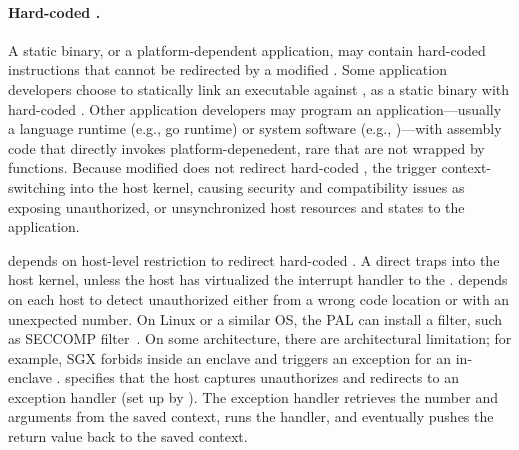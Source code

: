 \paragraph{Hard-coded \linuxapis{}.}
A static binary, or a platform-dependent application, may contain hard-coded  instructions
that cannot be redirected by a modified \libc{}.
Some application developers choose to statically link an executable against \libc{},
as a static binary with hard-coded \linuxapis{}. %
Other application developers may program an application---usually a language runtime (e.g., go runtime) or system software (e.g., )---with assembly code that directly invokes
platform-depenedent,
rare \linuxapis{} that are not wrapped by \libc{} functions.
Because modified \glibc{} does not redirect hard-coded \linuxapis{},
the \linuxapis{}
trigger context-switching into the host kernel,
causing security and compatibility issues as
exposing unauthorized, or unsynchronized host resources and states to the application.



\thelibos{} depends on host-level \linuxapi{} restriction to redirect hard-coded \linuxapis{}.
A direct \linuxapi{} traps into the host kernel,
unless the host has virtualized the interrupt handler to the \libos{}.
\graphene{} depends on each host to
detect unauthorized \linuxapis{} either from a wrong code location or with an unexpected \linuxapi{} number.
On Linux or a similar OS, the PAL can install a \linuxapi{} filter,
such as SECCOMP filter~\cite{seccomp}.
On some architecture, there are architectural limitation;
for example, SGX forbids \linuxapis{} inside an enclave and triggers an exception for an in-enclave \linuxapi{}.
\thehostabi{} specifies that the host captures unauthorizes \linuxapis{}
and redirects to an exception handler (set up by ).
The exception handler 
retrieves the \linuxapi{} number and arguments
from the saved context,
runs the \linuxapi{} handler,
and eventually pushes the return value back to the saved context. %


